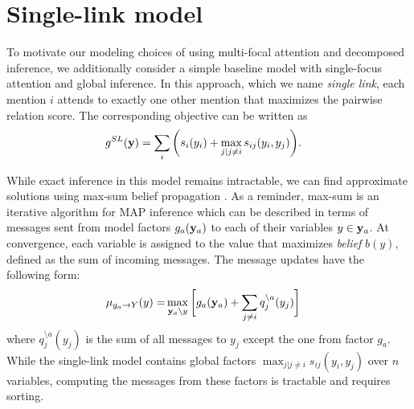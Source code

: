\section{Single-link model}
\label{sec:maxsum}

To motivate our modeling choices of using multi-focal attention and decomposed inference, we additionally consider a simple baseline model with single-focus attention and global inference. In this approach, which we name \emph{single link}, each mention $i$ attends to exactly one other mention that maximizes the pairwise relation score. The corresponding objective can be written as
\begin{align}
g^{SL}({\bf y}) &= \sum_i \bigg( s_i(y_i) + \max_{ j | j \neq i} s_{ij}(y_i, y_j) \bigg).
\end{align}

While exact inference in this model remains intractable, we can find approximate solutions using max-sum belief propagation \cite{Kschischang2001}. 
As a reminder, max-sum is an iterative algorithm for MAP inference which can be described in terms of messages sent from model factors $g_a({\bf y}_a)$ to each of their variables $y \in {\bf y}_a$. At convergence, each variable is assigned to the value that maximizes \emph{belief} $b(y)$, defined as the sum of incoming messages. The message updates have the following form:
\begin{align}
\mu_{g_a \rightarrow Y}(y) =& \max_{ {\bf y}_a \setminus y } \bigg[ g_a({\bf y}_a) + \sum_{j \neq i} q_j^{\setminus a}(y_j)\bigg]
\label{eq:damping}
\end{align}
\noindent where $q_j^{\setminus a}(y_j)$ is the sum of all messages to $y_j$ except the one from factor $g_a$. 
While the single-link model contains global factors $\max_{ j | j \neq i} s_{ij}(y_i, y_j)$ over $n$ variables, computing the messages from these factors is tractable and requires sorting.


